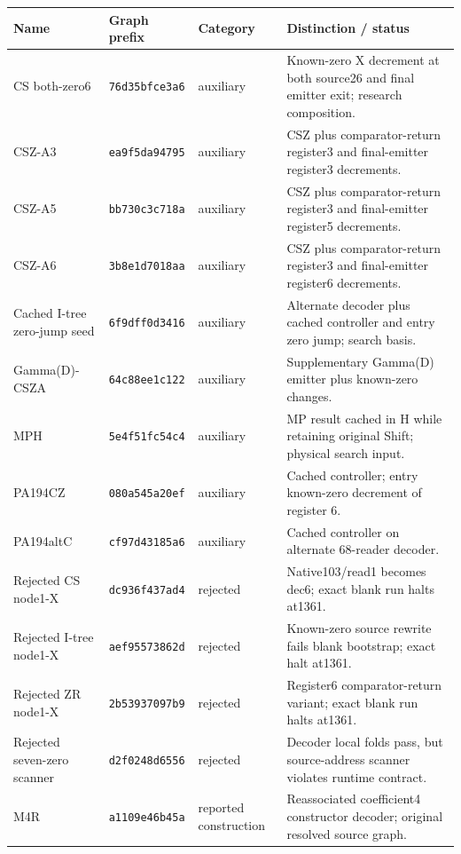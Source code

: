 \begingroup\small\setlength{\tabcolsep}{4pt}
\begin{longtable}{@{}p{.20\linewidth} p{.15\linewidth} p{.13\linewidth} p{.43\linewidth}@{}}
\toprule Name & Graph prefix & Category & Distinction / status\\\midrule\endhead
CS both-zero6 & \texttt{76d35bfce3a6} & auxiliary & Known-zero X decrement at both source26 and final emitter exit; research composition.\\[4pt]
CSZ-A3 & \texttt{ea9f5da94795} & auxiliary & CSZ plus comparator-return register3 and final-emitter register3 decrements.\\[4pt]
CSZ-A5 & \texttt{bb730c3c718a} & auxiliary & CSZ plus comparator-return register3 and final-emitter register5 decrements.\\[4pt]
CSZ-A6 & \texttt{3b8e1d7018aa} & auxiliary & CSZ plus comparator-return register3 and final-emitter register6 decrements.\\[4pt]
Cached I-tree zero-jump seed & \texttt{6f9dff0d3416} & auxiliary & Alternate decoder plus cached controller and entry zero jump; search basis.\\[4pt]
Gamma(D)-CSZA & \texttt{64c88ee1c122} & auxiliary & Supplementary Gamma(D) emitter plus known-zero changes.\\[4pt]
MPH & \texttt{5e4f51fc54c4} & auxiliary & MP result cached in H while retaining original Shift; physical search input.\\[4pt]
PA194CZ & \texttt{080a545a20ef} & auxiliary & Cached controller; entry known-zero decrement of register 6.\\[4pt]
PA194altC & \texttt{cf97d43185a6} & auxiliary & Cached controller on alternate 68-reader decoder.\\[4pt]
Rejected CS node1-X & \texttt{dc936f437ad4} & rejected & Native103/read1 becomes dec6; exact blank run halts at1361.\\[4pt]
Rejected I-tree node1-X & \texttt{aef95573862d} & rejected & Known-zero source rewrite fails blank bootstrap; exact halt at1361.\\[4pt]
Rejected ZR node1-X & \texttt{2b53937097b9} & rejected & Register6 comparator-return variant; exact blank run halts at1361.\\[4pt]
Rejected seven-zero scanner & \texttt{d2f0248d6556} & rejected & Decoder local folds pass, but source-address scanner violates runtime contract.\\[4pt]
M4R & \texttt{a1109e46b45a} & reported construction & Reassociated coefficient4 constructor decoder; original resolved source graph.\\[4pt]

\end{longtable}
